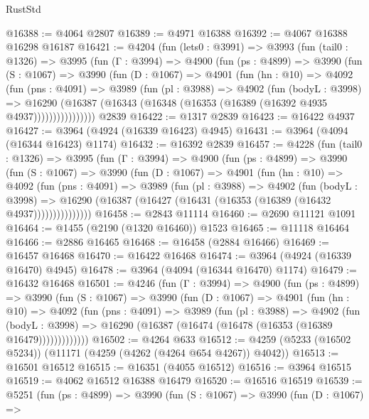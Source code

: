 \begin{lexlean}{RustStd}
\begin{coremodule}
@16388 := @4064 @2807
@16389 := @4971 @16388
@16392 := @4067 @16388 @16298 @16187
@16421 := @4204
    (fun (lets0 : @3991) =>
    @3993
      (fun (tail0 : @1326) =>
      @3995
        (fun (Γ : @3994) =>
        @4900
          (fun (ps : @4899) =>
          @3990
            (fun (S : @1067) =>
            @3990
              (fun (D : @1067) =>
              @4901
                (fun (hn : @10) =>
                @4092
                  (fun (pns : @4091) =>
                  @3989
                    (fun (pl : @3988) =>
                    @4902
                      (fun (bodyL : @3998) =>
                      @16290
                        (@16387 (@16343 (@16348 (@16353 (@16389 (@16392 @4935 @4937))))))))))))))))
    @2839
@16422 := @1317 @2839
@16423 := @16422 @4937
@16427 := @3964 (@4924 (@16339 @16423) @4945)
@16431 := @3964 (@4094 (@16344 @16423) @1174)
@16432 := @16392 @2839
@16457 := @4228
    (fun (tail0 : @1326) =>
    @3995
      (fun (Γ : @3994) =>
      @4900
        (fun (ps : @4899) =>
        @3990
          (fun (S : @1067) =>
          @3990
            (fun (D : @1067) =>
            @4901
              (fun (hn : @10) =>
              @4092
                (fun (pns : @4091) =>
                @3989
                  (fun (pl : @3988) =>
                  @4902
                    (fun (bodyL : @3998) =>
                    @16290 (@16387 (@16427 (@16431 (@16353 (@16389 (@16432 @4937)))))))))))))))
@16458 := @2843 @11114
@16460 := @2690 @11121 @1091
@16464 := @1455 (@2190 (@1320 @16460)) @1523
@16465 := @11118 @16464
@16466 := @2886 @16465
@16468 := @16458 (@2884 @16466)
@16469 := @16457 @16468
@16470 := @16422 @16468
@16474 := @3964 (@4924 (@16339 @16470) @4945)
@16478 := @3964 (@4094 (@16344 @16470) @1174)
@16479 := @16432 @16468
@16501 := @4246
    (fun (Γ : @3994) =>
    @4900
      (fun (ps : @4899) =>
      @3990
        (fun (S : @1067) =>
        @3990
          (fun (D : @1067) =>
          @4901
            (fun (hn : @10) =>
            @4092
              (fun (pns : @4091) =>
              @3989
                (fun (pl : @3988) =>
                @4902
                  (fun (bodyL : @3998) =>
                  @16290 (@16387 (@16474 (@16478 (@16353 (@16389 @16479)))))))))))))
@16502 := @4264 @633
@16512 := @4259 (@5233 (@16502 @5234)) (@11171 (@4259 (@4262 (@4264 @654 @4267)) @4042))
@16513 := @16501 @16512
@16515 := @16351 (@4055 @16512)
@16516 := @3964 @16515
@16519 := @4062 @16512 @16388 @16479
@16520 := @16516 @16519
@16539 := @5251
    (fun (ps : @4899) =>
    @3990
      (fun (S : @1067) =>
      @3990
        (fun (D : @1067) =>

\end{coremodule}
\end{lexlean}
